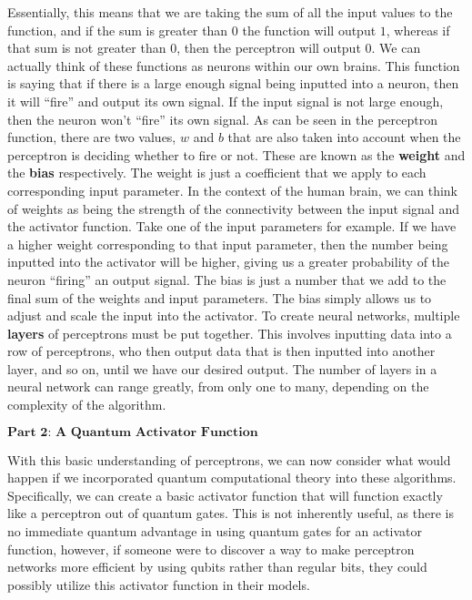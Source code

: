 \documentclass{article}
\begin{document}
\vspace{7}
Essentially, this means that we are taking the sum of all the input values to the function, and if the sum is greater than $0$ the function will output $1$, whereas if that sum is not greater than $0$, then the perceptron will output $0$. We can actually think of these functions as neurons within our own brains. This function is saying that if there is a large enough signal being inputted into a neuron, then it will “fire” and output its own signal. If the input signal is not large enough, then the neuron won’t “fire” its own signal. As can be seen in the perceptron function, there are two values, $w$ and $b$ that are also taken into account when the perceptron is deciding whether to fire or not. These are known as the \textbf{weight }and the \textbf{bias} respectively. The weight is just a coefficient that we apply to each corresponding input parameter. In the context of the human brain, we can think of weights as being the strength of the connectivity between the input signal and the activator function. Take one of the input parameters for example. If we have a higher weight corresponding to that input parameter, then the number being inputted into the activator will be higher, giving us a greater probability of the neuron “firing” an output signal. The bias is just a number that we add to the final sum of the weights and input parameters. The bias simply allows us to adjust and scale the input into the activator.
\newline\newline
To create neural networks, multiple \textbf{layers} of perceptrons must be put together. This involves inputting data into a row of perceptrons, who then output data that is then inputted into another layer, and so on, until we have our desired output. The number of layers in a neural network can range greatly, from only one to many, depending on the complexity of the algorithm.
\newline\newline
\begin{center}
$\textbf{Part 2: A Quantum Activator Function}$
\end{center}
\newline\newline
With this basic understanding of perceptrons, we can now consider what would happen if we incorporated quantum computational theory into these algorithms. Specifically, we can create a basic activator function that will function exactly like a perceptron out of quantum gates. This is not inherently useful, as there is no immediate quantum advantage in using quantum gates for an activator function, however, if someone were to discover a way to make perceptron networks more efficient by using qubits rather than regular bits, they could possibly utilize this activator function in their models.
\end{document}
